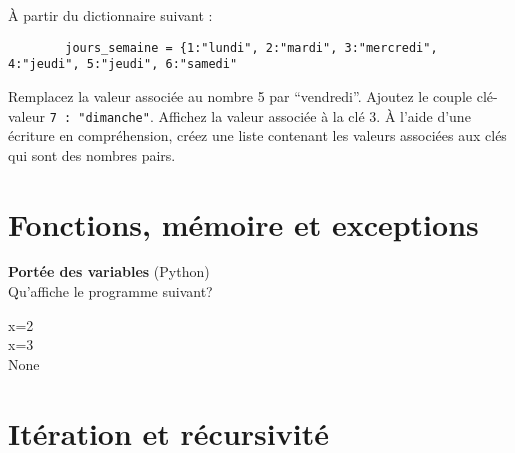 \begin{Exercice}[5 minutes]
    À partir du dictionnaire suivant :
    \begin{lstlisting}
        jours_semaine = {1:"lundi", 2:"mardi", 3:"mercredi", 4:"jeudi", 5:"jeudi", 6:"samedi" \end{lstlisting}

Remplacez la valeur associée au nombre 5 par ``vendredi''. Ajoutez le couple clé-valeur \lstinline{7 : "dimanche"}. Affichez la valeur associée à la clé 3.
À l'aide d'une écriture en compréhension, créez une liste contenant les valeurs associées aux clés qui sont des nombres pairs.

    \begin{solution}
        
    \end{solution}
\end{Exercice}


\section{Fonctions, mémoire et exceptions}
\begin{Exercice}[5 minutes] \textbf{Portée des variables} (Python)\\
    Qu'affiche le programme suivant? \\

    

    \begin{solution}
            x=2 \\
            x=3 \\
            None
    \end{solution}

    
 \end{Exercice}


\section{Itération et récursivité}

